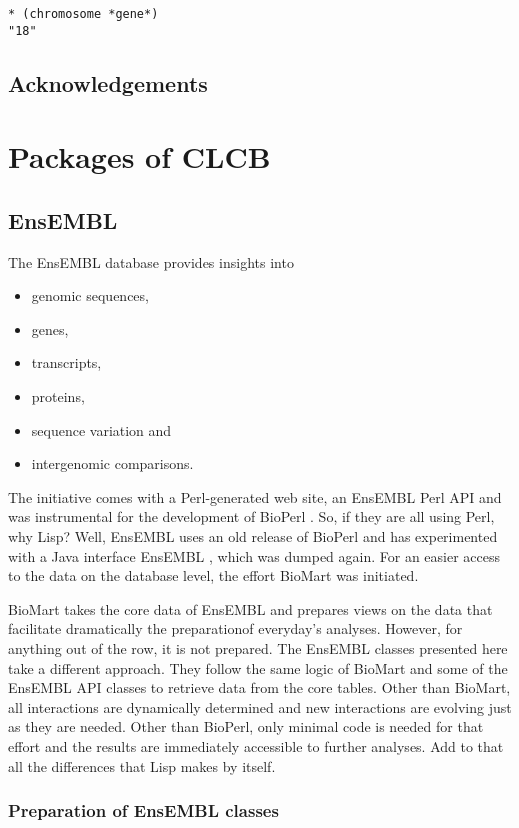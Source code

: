 \documentclass{book}
\newcommand\ensembl{EnsEMBL }
\newcommand\CLCB{CLCB }
\begin{document}
\begin{lstlisting}
* (chromosome *gene*)
"18"
\end{lstlisting}

\section{Acknowledgements}

\chapter{Packages of \CLCB}

\section{\ensembl}

The \ensembl database provides insights into 
\begin{itemize}
\item genomic sequences,
\item genes,
\item transcripts,
\item proteins,
\item sequence variation and
\item intergenomic comparisons.
\end{itemize}
The initiative comes with a Perl-generated web site, an \ensembl
Perl API and was instrumental for the development of BioPerl
\cite{bioperl:2002}. So, if they are all using Perl, why Lisp? Well,
\ensembl uses an old release of BioPerl and has experimented with a Java
interface \ensembl, which was dumped again. For an easier access to the
data on the database level, the effort BioMart was initiated.

BioMart takes the core data of \ensembl and prepares views on the data that
facilitate dramatically the preparationof everyday's analyses. However,
for anything out of the row, it is not prepared. The \ensembl classes
presented here take a different approach. They follow the same logic of
BioMart and some of the \ensembl API classes to retrieve data from the core
tables. Other than BioMart, all interactions are dynamically determined
and new interactions are evolving just as they are needed. Other than
BioPerl, only minimal code is needed for that effort and the results
are immediately accessible to further analyses. Add to that all the
differences that Lisp makes by itself.

\subsection{Preparation of \ensembl classes}
\end{document}

